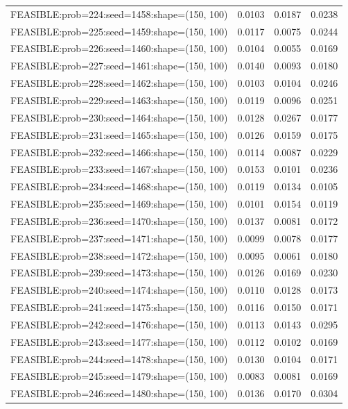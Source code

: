 \begin{longtable}{lccc}
FEASIBLE:prob=224:seed=1458:shape=(150, 100) &   0.0103 & 0.0187 & 0.0238 \\
FEASIBLE:prob=225:seed=1459:shape=(150, 100) &   0.0117 & 0.0075 & 0.0244 \\
FEASIBLE:prob=226:seed=1460:shape=(150, 100) &   0.0104 & 0.0055 & 0.0169 \\
FEASIBLE:prob=227:seed=1461:shape=(150, 100) &   0.0140 & 0.0093 & 0.0180 \\
FEASIBLE:prob=228:seed=1462:shape=(150, 100) &   0.0103 & 0.0104 & 0.0246 \\
FEASIBLE:prob=229:seed=1463:shape=(150, 100) &   0.0119 & 0.0096 & 0.0251 \\
FEASIBLE:prob=230:seed=1464:shape=(150, 100) &   0.0128 & 0.0267 & 0.0177 \\
FEASIBLE:prob=231:seed=1465:shape=(150, 100) &   0.0126 & 0.0159 & 0.0175 \\
FEASIBLE:prob=232:seed=1466:shape=(150, 100) &   0.0114 & 0.0087 & 0.0229 \\
FEASIBLE:prob=233:seed=1467:shape=(150, 100) &   0.0153 & 0.0101 & 0.0236 \\
FEASIBLE:prob=234:seed=1468:shape=(150, 100) &   0.0119 & 0.0134 & 0.0105 \\
FEASIBLE:prob=235:seed=1469:shape=(150, 100) &   0.0101 & 0.0154 & 0.0119 \\
FEASIBLE:prob=236:seed=1470:shape=(150, 100) &   0.0137 & 0.0081 & 0.0172 \\
FEASIBLE:prob=237:seed=1471:shape=(150, 100) &   0.0099 & 0.0078 & 0.0177 \\
FEASIBLE:prob=238:seed=1472:shape=(150, 100) &   0.0095 & 0.0061 & 0.0180 \\
FEASIBLE:prob=239:seed=1473:shape=(150, 100) &   0.0126 & 0.0169 & 0.0230 \\
FEASIBLE:prob=240:seed=1474:shape=(150, 100) &   0.0110 & 0.0128 & 0.0173 \\
FEASIBLE:prob=241:seed=1475:shape=(150, 100) &   0.0116 & 0.0150 & 0.0171 \\
FEASIBLE:prob=242:seed=1476:shape=(150, 100) &   0.0113 & 0.0143 & 0.0295 \\
FEASIBLE:prob=243:seed=1477:shape=(150, 100) &   0.0112 & 0.0102 & 0.0169 \\
FEASIBLE:prob=244:seed=1478:shape=(150, 100) &   0.0130 & 0.0104 & 0.0171 \\
FEASIBLE:prob=245:seed=1479:shape=(150, 100) &   0.0083 & 0.0081 & 0.0169 \\
FEASIBLE:prob=246:seed=1480:shape=(150, 100) &   0.0136 & 0.0170 & 0.0304 \\

\end{longtable}
